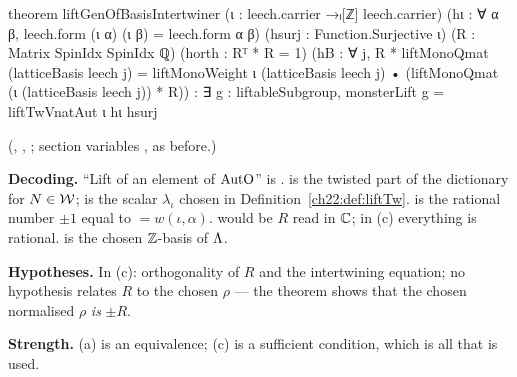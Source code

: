 \begin{leancode}
theorem liftGenOfBasisIntertwiner (ι : leech.carrier →ₗ[ℤ] leech.carrier)
    (hι : ∀ α β, leech.form (ι α) (ι β) = leech.form α β)
    (hsurj : Function.Surjective ι) (R : Matrix SpinIdx SpinIdx ℚ)
    (horth : Rᵀ * R = 1)
    (hB : ∀ j, R * liftMonoQmat (latticeBasis leech j) =
      liftMonoWeight ι (latticeBasis leech j) •
        (liftMonoQmat (ι (latticeBasis leech j)) * R)) :
    ∃ g : liftableSubgroup, monsterLift g = liftTwVnatAut ι hι hsurj
\end{leancode}
(, ,
; section variables ,  as before.)
\begin{dictionary}
\textbf{Decoding.}  ``Lift of an element of $\mathrm{AutO}$'' is .
 is the twisted part of the dictionary for $N\in\mathcal{W}$;  is the scalar $\lambda_\iota$
chosen in Definition~\ref{ch22:def:liftTw}.   is the rational number $\pm1$ equal to
 $=w(\iota,\alpha)$.   would be $R$ read in ${\mathbb{C}}$; in (c) everything
is rational.   is the chosen ${\mathbb{Z}}$-basis of ${\Lambda}$.

\textbf{Hypotheses.}  In (c): orthogonality of $R$ and the intertwining equation; no hypothesis relates $R$ to the
chosen $\rho$ --- the theorem shows that the chosen normalised $\rho$ \emph{is} $\pm R$.

\textbf{Strength.}  (a) is an equivalence; (c) is a sufficient condition, which is all that is used.
\end{dictionary}
